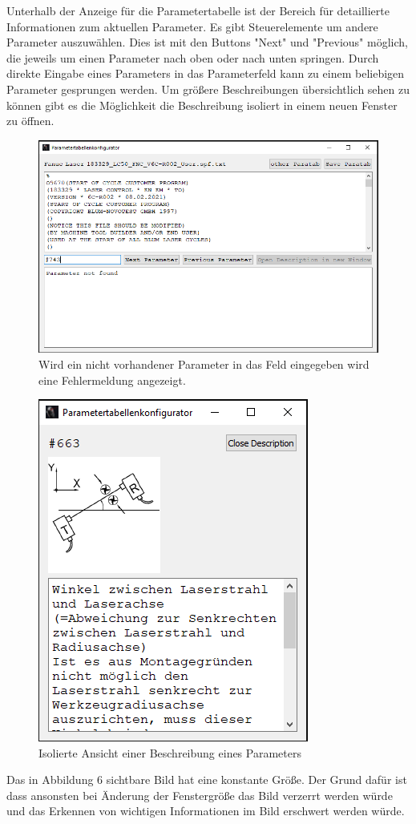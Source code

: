 \documentclass[12pt,a4paper]{article}
\begin{document}
Unterhalb der Anzeige für die Parametertabelle ist der Bereich für detaillierte Informationen zum aktuellen Parameter. Es gibt Steuerelemente um andere Parameter auszuwählen. Dies ist mit den Buttons "Next" und "Previous" möglich, die jeweils um einen Parameter nach oben oder nach unten springen. Durch direkte Eingabe eines Parameters in das Parameterfeld kann zu einem beliebigen Parameter gesprungen werden. Um größere Beschreibungen übersichtlich sehen zu können gibt es die Möglichkeit die Beschreibung isoliert in einem neuen Fenster zu öffnen.\\
\begin{figure}[H]
\includegraphics[scale=0.6]{pictures_and_research/Bilder/fehlermeldung_invalid_parameter.PNG}
\caption{Wird ein nicht vorhandener Parameter in das Feld eingegeben wird eine Fehlermeldung angezeigt.}
\end{figure}
\begin{figure}[H]
\includegraphics[scale=1]{pictures_and_research/Bilder/descriptW.PNG}
\caption{Isolierte Ansicht einer Beschreibung eines Parameters}
\end{figure}\noindent
Das in Abbildung 6 sichtbare Bild hat eine konstante Größe. Der Grund dafür ist dass ansonsten bei Änderung der Fenstergröße das Bild verzerrt werden würde und das Erkennen von wichtigen Informationen im Bild erschwert werden würde.
\end{document}
